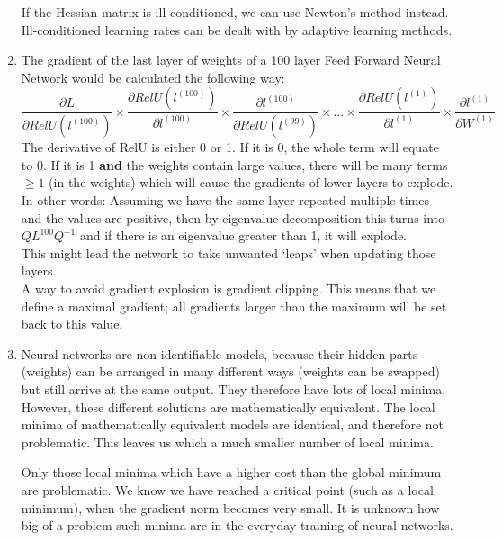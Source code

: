 \begin{exercise}
\begin{enumerate}
    If the Hessian matrix is ill-conditioned, we can use Newton's method instead. Ill-conditioned learning rates can be dealt with by adaptive learning methods.
    \item The gradient of the last layer of weights of a 100 layer Feed Forward Neural Network would be calculated the following way:
    \begin{equation}
        \frac{\partial L}{\partial RelU(l^{(100)})} \times \frac{\partial RelU(l^{(100)})}{\partial l^{(100)}} \times \frac{\partial l^{(100)}}{\partial RelU(l^{(99)})} \times ... \times \frac{\partial RelU(l^{(1)})}{\partial l^{(1)}} \times \frac{\partial l^{(1)}}{\partial W^{(1)}}
    \end{equation}
    The derivative of RelU is either 0 or 1. If it is 0, the whole term will equate to 0. If it is 1 \textbf{and} the weights contain large values, there will be many terms $\geq 1$ (in the weights) which will cause the gradients of lower layers to explode. In other words: Assuming we have the same layer repeated multiple times and the values are positive, then by eigenvalue decomposition this turns into $Q L^{100} Q^{-1}$ and if there is an eigenvalue greater than 1, it will explode.\\
    This might lead the network to take unwanted `leaps' when updating those layers. \\
    A way to avoid gradient explosion is gradient clipping. This means that we define a maximal gradient; all gradients larger than the maximum will be set back to this value.
    \item Neural networks are non-identifiable models, because their hidden parts (weights) can be arranged in many different ways (weights can be swapped) but still arrive at the same output. They therefore have lots of local minima. However, these different solutions are mathematically equivalent. The local minima of mathematically equivalent models are identical, and therefore not problematic. This leaves us which a much smaller number of local minima.
    
    Only those local minima which have a higher cost than the global minimum are problematic. We know we have reached a critical point (such as a local minimum), when the gradient norm becomes very small. It is unknown how big of a problem such minima are in the everyday training of neural networks. 
\end{enumerate}
\end{exercise}

